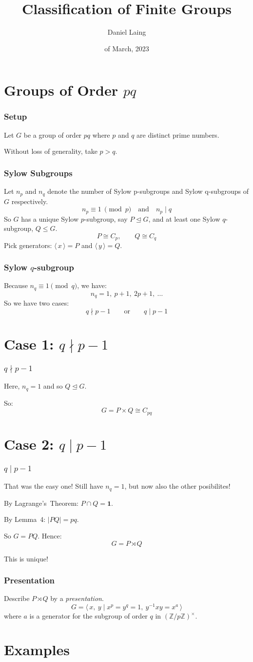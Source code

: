\documentclass[12pt]{beamer}
\title{Classification of Finite Groups}
\author{Daniel Laing}
\date{\nth{23} of March, 2023}
\institute{\textit{MT4599}}
\newcommand{\nrmsgp}{\unlhd}
\newcommand{\gen}[1]{\langle\,#1\,\rangle}
\begin{document}
\frame{\titlepage}

\section{Groups of Order \(pq\)}

\begin{frame}
\frametitle{Setup}
Let \(G\) be a group of order \(pq\) where \(p\) and \(q\) are distinct prime numbers. \pause

Without loss of generality, take \(p > q\).
\end{frame}

\begin{frame}
\frametitle{Sylow Subgroups}
Let \(n_p\) and \(n_q\) denote the number of Sylow p-subgroups and Sylow q-subgroups of \(G\) respectively. \pause
\[n_p \equiv 1 \ \pmod{p} \quad \text{and} \quad n_p \mid q\] \pause
So \(G\) has a unique Sylow \(p\)-subgroup, say \(P \nrmsgp G\), and at least one Sylow \(q\)-subgroup, \(Q \leqslant
    G\). \pause
\[ P \cong C_{p}, \qquad Q \cong C_{q} \]
Pick generators: \(\gen{x} = P\) and \(\gen{y} = Q\).
\end{frame}

\begin{frame}
\frametitle{Sylow \(q\)-subgroup}
Because \(n_{q} \equiv 1 \pmod{q}\), we have:
\[ n_{q} = 1,\ p + 1,\ 2p + 1,\ \ldots \] \pause
So we have two cases:
\[ q \nmid p-1 \qquad \text{or} \qquad q \mid p-1 \]
\end{frame}

\section{Case 1: \(q \nmid p-1\)}

\begin{frame}
\frametitle{\(q \nmid p-1\)}
Here, \(n_{q} = 1\) and so \(Q \nrmsgp G\). \pause

So:
\[ G = P \times Q \cong C_{pq} \]
\end{frame}

\section{Case 2: \(q \mid p-1\)}
\begin{frame}
\frametitle{\(q \mid p-1\)}
That was the easy one!
Still have \(n_q = 1\), but now also the other posibilites! \pause

By Lagrange's~Theorem: \(P \cap Q = \bm{1}\). \pause

By Lemma~4: \(|PQ| = pq\).

So \(G = PQ\). \pause
Hence:
\[ G = P \rtimes Q \] \pause

This is unique!
\end{frame}

\begin{frame}
\frametitle{Presentation}
Describe \(P \rtimes Q\) by a \emph{presentation}.
\[ G = \gen{x,\ y \mid x^p = y^q = 1,\ y^{-1}xy = x^a} \]
where \(a\) is a generator for the subgroup of order \(q\) in \({(\mathbb{Z}/p\mathbb{Z})}^\times\).
\end{frame}

\section{Examples}
\end{document}
